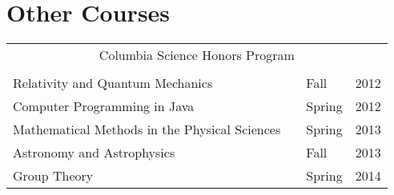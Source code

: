 \documentclass[10pt,letterpaper,sans]{moderncv}
\begin{document}
\section{Other Courses}
\setlength{\tabcolsep}{10pt}
\begin{tabular}{l p{0.6in} l l}
  \\
  \multicolumn{4}{c}{Columbia Science Honors Program} \\
  \\
  Relativity and Quantum Mechanics              & \hfill & Fall   & 2012 \\
  Computer Programming in Java                  & \hfill & Spring & 2012 \\
  Mathematical Methods in the Physical Sciences & \hfill & Spring & 2013 \\
  Astronomy and Astrophysics                    & \hfill & Fall   & 2013 \\
  Group Theory                                  & \hfill & Spring & 2014 \\
\end{tabular}
\end{document}
